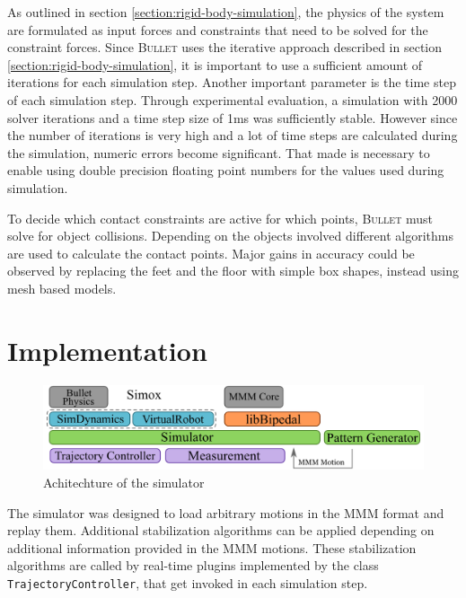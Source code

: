\documentclass[english,ngerman]{KITreprt}
\newcommand{\name}[1]{\textsc{#1}}
\begin{document}
As outlined in section \ref{section:rigid-body-simulation}, the physics
of the system are formulated as input forces and constraints that need
to be solved for the constraint forces. Since \name{Bullet} uses the
iterative approach described in section
\ref{section:rigid-body-simulation}, it is important to use a sufficient
amount of iterations for each simulation step. Another important
parameter is the time step of each simulation step. Through experimental
evaluation, a simulation with 2000 solver iterations and a time step
size of 1ms was sufficiently stable. However since the number of
iterations is very high and a lot of time steps are calculated during
the simulation, numeric errors become significant. That made is
necessary to enable using double precision floating point numbers for
the values used during simulation.

To decide which contact constraints are active for which points,
\name{Bullet} must solve for object collisions. Depending on the objects
involved different algorithms are used to calculate the contact points.
Major gains in accuracy could be observed by replacing the feet and the
floor with simple box shapes, instead using mesh based models.

\section{Implementation}\label{implementation-3}

\begin{figure}[htb]
\vspace*{-1em}
\includegraphics[width=\textwidth]{images/architechture.png}
\caption{Achitechture of the simulator}
\label{img:simulator-achitechture}
\end{figure}

The simulator was designed to load arbitrary motions in the \name{MMM}
format and replay them. Additional stabilization algorithms can be
applied depending on additional information provided in the \name{MMM}
motions. These stabilization algorithms are called by real-time plugins
implemented by the class \texttt{TrajectoryController}, that get invoked
in each simulation step.
\end{document}
